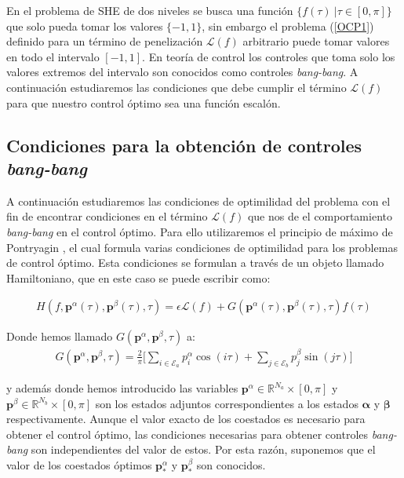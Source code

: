 En el problema de SHE de dos niveles se busca una función $\{f(\tau) \ |  \tau \in [0,\pi] \}$  que solo pueda tomar los valores $\{-1,1\}$, sin embargo el problema (\ref{OCP1}) definido para un término de penelización $\mathcal{L}(f)$ arbitrario puede tomar valores en todo el intervalo $[-1,1]$. 
%
En teoría de control los controles que toma solo los valores extremos del intervalo son conocidos como controles \emph{bang-bang}. A continuación estudiaremos las condiciones que debe cumplir el término $\mathcal{L}(f)$ para que nuestro control óptimo sea una función escalón.

\subsection{Condiciones  para la obtención de controles \emph{bang-bang}}
A continuación estudiaremos las condiciones de optimilidad del problema con el fin de encontrar condiciones en el término $\mathcal{L}(f)$ que nos de el comportamiento \emph{bang-bang} en el control óptimo. 
%
Para ello utilizaremos el principio de máximo de Pontryagin \cite{pontryagin2018mathematical}, el cual formula varias condiciones de optimilidad para los problemas de control óptimo. 
%
Esta condiciones se formulan a través de un objeto llamado Hamiltoniano, que  en este caso se puede escribir como:


\begin{gather}\label{hamil}
    H(f,\bm{p}^\alpha(\tau),\bm{p}^\beta(\tau),\tau) = \epsilon \mathcal{L}(f) + 
    G(\bm{p}^\alpha(\tau),\bm{p}^\beta(\tau),\tau) f(\tau)
\end{gather}

Donde  hemos llamado $G(\bm{p}^\alpha,\bm{p}^\beta,\tau)$ a:
    \begin{gather}
        G(\bm{p}^\alpha,\bm{p}^\beta,\tau) = \frac{2}{\pi} \Bigg[ 
            \sum_{i \in \mathcal{E}_a} p^\alpha_i \cos(i\tau)+ 
            \sum_{j \in \mathcal{E}_b} p^\beta_j \sin(j\tau) 
        \Bigg]
    \end{gather}

y además donde hemos introducido las variables $\bm{p}^\alpha \in \mathbb{R}^{N_a} \times [0,\pi]$ y $\bm{p}^\beta \in \mathbb{R}^{N_b}  \times [0,\pi]$ son los estados adjuntos correspondientes a los estados $\bm{\alpha}$ y $\bm{\beta}$ respectivamente.  
%
Aunque el valor exacto de los coestados es necesario para obtener el control óptimo, las condiciones necesarias para obtener controles \emph{bang-bang} son independientes del valor de estos. Por esta razón, suponemos que el valor de los coestados óptimos $\bm{p}_*^\alpha$ y $\bm{p}_*^\beta$ son conocidos.
\newline 

